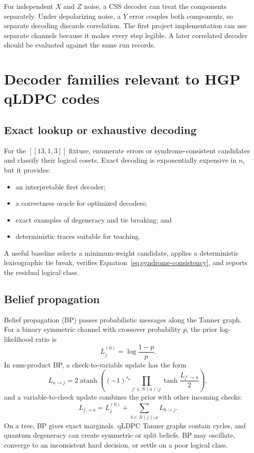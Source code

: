 \documentclass[11pt,letterpaper]{article}
\begin{document}
For independent $X$ and $Z$ noise, a CSS decoder can treat the components separately. Under
depolarizing noise, a $Y$ error couples both components, so separate decoding discards correlation.
The first project implementation can use separate channels because it makes every step legible. A
later correlated decoder should be evaluated against the same run records.

\section{Decoder families relevant to HGP qLDPC codes}

\subsection{Exact lookup or exhaustive decoding}

For the $[[13,1,3]]$ fixture, enumerate errors or syndrome-consistent candidates and classify their
logical cosets. Exact decoding is exponentially expensive in $n$, but it provides:

\begin{itemize}
  \item an interpretable first decoder;
  \item a correctness oracle for optimized decoders;
  \item exact examples of degeneracy and tie breaking; and
  \item deterministic traces suitable for teaching.
\end{itemize}

A useful baseline selects a minimum-weight candidate, applies a deterministic lexicographic tie
break, verifies Equation~\eqref{eq:syndrome-consistency}, and reports the residual logical class.

\subsection{Belief propagation}

Belief propagation (BP) passes probabilistic messages along the Tanner graph. For a binary
symmetric channel with crossover probability $p$, the prior log-likelihood ratio is
\begin{equation}
  L_j^{(0)}=\log\frac{1-p}{p}.
\end{equation}
In sum-product BP, a check-to-variable update has the form
\begin{equation}
  L_{a\rightarrow j}=2\operatorname{atanh}\left(
  (-1)^{s_a}\prod_{j'\in N(a)\setminus j}\tanh\frac{L_{j'\rightarrow a}}{2}
  \right),
\end{equation}
and a variable-to-check update combines the prior with other incoming checks:
\begin{equation}
  L_{j\rightarrow a}=L_j^{(0)}+\sum_{b\in N(j)\setminus a}L_{b\rightarrow j}.
\end{equation}
On a tree, BP gives exact marginals. qLDPC Tanner graphs contain cycles, and quantum degeneracy can
create symmetric or split beliefs. BP may oscillate, converge to an inconsistent hard decision, or
settle on a poor logical class.
\end{document}
